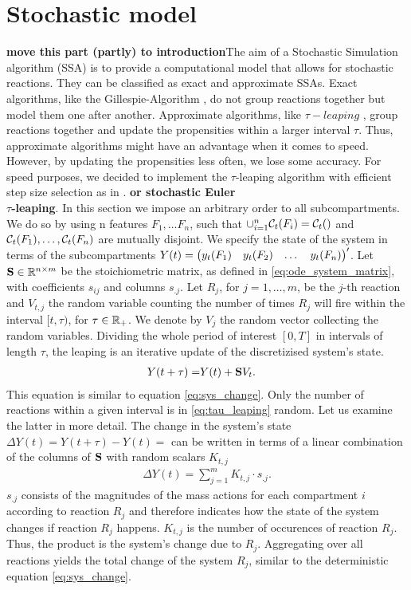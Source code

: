 \section{Stochastic model}
\label{sec:stochastic}
\textbf{move this part (partly) to introduction}The aim of a Stochastic Simulation algorithm (SSA) is to provide a computational model that allows for stochastic reactions. They can be classified as exact and approximate SSAs. Exact algorithms, like the Gillespie-Algorithm \citep{Gillespie.1977}, do not group reactions together but model them one after another. Approximate algorithms, like $\tau-leaping$ \citep{Gillespie.2001}, group reactions together and update the propensities within a larger interval $\tau$. Thus, approximate algorithms might have an advantage when it comes to speed. However, by updating the propensities less often, we lose some accuracy. For speed purposes, we decided to implement the $\tau$-leaping algorithm with efficient step size selection as in \cite{Cao.2006}. \textbf{or stochastic Euler} \\

\textbf{$\tau$-leaping}. In this section we impose an arbitrary order to all subcompartments. We do so by using n features $F_1, \dots F_n$, such that $\cup_{i=1}^n \mathcal{C}_t(F_i) = \mathcal{C}_t()$ and $\mathcal{C}_t(F_1), \dots, \mathcal{C}_t(F_n)$ are mutually disjoint. We specify the state of the system in terms of the subcompartments $Y(t) = \begin{pmatrix} y_t(F_1) & y_t(F_2) & \dots & y_t(F_n)\end{pmatrix}'$. Let $\mathbf{S} \in \mathbb{R}^{n \times m}$ be the stoichiometric matrix, as defined in \eqref{eq:ode_system_matrix}, with coefficients $s_{ij}$ and columns $s_{.j}$. Let $R_j$, for $j=1, \dots, m$, be the $j$-th reaction and $V_{t,j}$ the random variable counting the number of times $R_j$ will fire within the interval $[t, \tau)$, for $\tau \in \mathbb{R}_+$. We denote by $V_j$ the random vector collecting the random variables. Dividing the whole period of interest $[0, T]$ in intervals of length $\tau$, the leaping is an iterative update of the discretizised system's state.
\begin{align}
\label{eq:tau_leaping}
Y(t + \tau) =& Y(t) + \mathbf{S} V_t.
\end{align}
This equation is similar to equation \eqref{eq:sys_change}. Only the number of reactions within a given interval is in \eqref{eq:tau_leaping} random. Let us examine the latter in more detail. The change in the system's state $\Delta Y(t) = Y(t + \tau) - Y(t)=$ can be written in terms of a linear combination of the columns of $\mathbf{S}$ with random scalars $K_{t,j}$
\begin{align}
\Delta Y(t) = \sum_{j=1}^m K_{t,j} \cdot s_{.j}.
\end{align}
$s_{.j}$ consists of the magnitudes of the mass actions for each compartment $i$ according to reaction $R_j$ and therefore indicates how the state of the system changes if reaction $R_j$ happens. $K_{t,j}$ is the number of occurences of reaction $R_j$. Thus, the product is the system's change due to $R_j$. Aggregating over all reactions yields the total change of the system $R_j$, similar to the deterministic equation \eqref{eq:sys_change}.\\  

